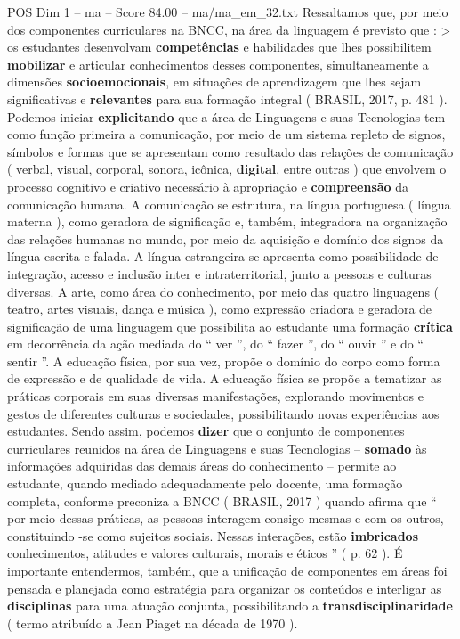 \begin{textsample}{POS Dim 1 – ma – Score 84.00 – ma/ma\_em\_32.txt}
Ressaltamos que, por meio dos componentes curriculares na BNCC, na área da linguagem é previsto que : > os estudantes desenvolvam \textbf{competências} e habilidades que lhes possibilitem \textbf{mobilizar} e articular conhecimentos desses componentes, simultaneamente a dimensões \textbf{socioemocionais}, em situações de aprendizagem que lhes sejam significativas e \textbf{relevantes} para sua formação integral ( BRASIL, 2017, p. 481 ).
Podemos iniciar \textbf{explicitando} que a área de Linguagens e suas Tecnologias tem como função primeira a comunicação, por meio de um sistema repleto de signos, símbolos e formas que se apresentam como resultado das relações de comunicação ( verbal, visual, corporal, sonora, icônica, \textbf{digital}, entre outras ) que envolvem o processo cognitivo e criativo necessário à apropriação e \textbf{compreensão} da comunicação humana.
A comunicação se estrutura, na língua portuguesa ( língua materna ), como geradora de significação e, também, integradora na organização das relações humanas no mundo, por meio da aquisição e domínio dos signos da língua escrita e falada.
A língua estrangeira se apresenta como possibilidade de integração, acesso e inclusão inter e intraterritorial, junto a pessoas e culturas diversas.
A arte, como área do conhecimento, por meio das quatro linguagens ( teatro, artes visuais, dança e música ), como expressão criadora e geradora de significação de uma linguagem que possibilita ao estudante uma formação \textbf{crítica} em decorrência da ação mediada do “ ver ”, do “ fazer ”, do “ ouvir ” e do “ sentir ”.
A educação física, por sua vez, propõe o domínio do corpo como forma de expressão e de qualidade de vida.
A educação física se propõe a tematizar as práticas corporais em suas diversas manifestações, explorando movimentos e gestos de diferentes culturas e sociedades, possibilitando novas experiências aos estudantes.
Sendo assim, podemos \textbf{dizer} que o conjunto de componentes curriculares reunidos na área de Linguagens e suas Tecnologias – \textbf{somado} às informações adquiridas das demais áreas do conhecimento – permite ao estudante, quando mediado adequadamente pelo docente, uma formação completa, conforme preconiza a BNCC ( BRASIL, 2017 ) quando afirma que “ por meio dessas práticas, as pessoas interagem consigo mesmas e com os outros, constituindo -se como sujeitos sociais.
Nessas interações, estão \textbf{imbricados} conhecimentos, atitudes e valores culturais, morais e éticos ” ( p. 62 ).
É importante entendermos, também, que a unificação de componentes em áreas foi pensada e planejada como estratégia para organizar os conteúdos e interligar as \textbf{disciplinas} para uma atuação conjunta, possibilitando a \textbf{transdisciplinaridade} ( termo atribuído a Jean Piaget na década de 1970 ).

\end{textsample}
